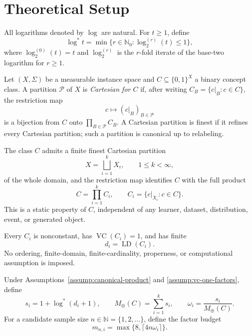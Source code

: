 \section{Theoretical Setup}\label{sec:setup}

All logarithms denoted by \(\log\) are natural.  For \(t\ge1\), define
\[
\log^*t
=\min\{r\in\mathbb N_0:\log_2^{(r)}(t)\le1\},
\]
where \(\log_2^{(0)}(t)=t\) and \(\log_2^{(r)}\) is the \(r\)-fold
iterate of the base-two logarithm for \(r\ge1\).

Let \((X,\Sigma)\) be a measurable instance space and
\(C\subseteq\{0,1\}^X\) a binary concept class.  A partition
\(\mathcal P\) of \(X\) is \emph{Cartesian for \(C\)} if, after writing
\(C_B=\{c|_B:c\in C\}\), the restriction map
\[
c\longmapsto(c|_B)_{B\in\mathcal P}
\]
is a bijection from \(C\) onto \(\prod_{B\in\mathcal P}C_B\).  A
Cartesian partition is finest if it refines every Cartesian partition;
such a partition is canonical up to relabeling.

\begin{assumption}
\label{assump:canonical-product}
The class \(C\) admits a finite finest Cartesian partition
\[
X=\bigsqcup_{i=1}^kX_i,\qquad 1\le k<\infty,
\]
of the whole domain, and the restriction map identifies \(C\) with the
full product
\[
C=\prod_{i=1}^k C_i,
\qquad
C_i=\{c|_{X_i}:c\in C\}.
\]
This is a static property of \(C\), independent of any learner,
dataset, distribution, event, or generated object.
\end{assumption}

\begin{assumption}
\label{assump:vc-one-factors}
Every \(C_i\) is nonconstant, has
\(\operatorname{VC}(C_i)=1\), and has finite
\[
d_i=\operatorname{LD}(C_i).
\]
No ordering, finite-domain, finite-cardinality, properness, or
computational assumption is imposed.
\end{assumption}

Under Assumptions~\ref{assump:canonical-product} and
\ref{assump:vc-one-factors}, define
\begin{equation}\label{eq:setup-complexities}
s_i=1+\log^*(d_i+1),
\qquad
M_\oplus(C)=\sum_{i=1}^k s_i,
\qquad
\omega_i=\frac{s_i}{M_\oplus(C)}.
\end{equation}
For a candidate sample size \(n\in\mathbb N=\{1,2,\ldots\}\), define
the factor budget
\begin{equation}\label{eq:setup-factor-budget}
m_{n,i}=\max\{8,\lceil4n\omega_i\rceil\}.
\end{equation}

